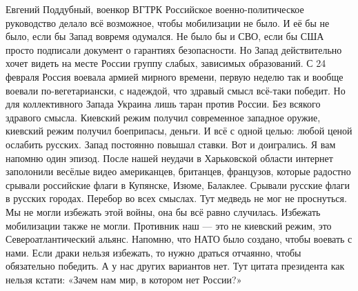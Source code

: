 Евгений Поддубный, военкор ВГТРК
Российское военно-политическое руководство делало всё возможное, чтобы мобилизации не было. И её бы не было, если бы Запад вовремя одумался. Не было бы и СВО, если бы США просто подписали документ о гарантиях безопасности. Но Запад действительно хочет видеть на месте России группу слабых, зависимых образований.
С 24 февраля Россия воевала армией мирного времени, первую неделю так и вообще воевали по-вегетариански, с надеждой, что здравый смысл всё-таки победит. Но для коллективного Запада Украина лишь таран против России. Без всякого здравого смысла. Киевский режим получил современное западное оружие, киевский режим получил боеприпасы, деньги. И всё с одной целью: любой ценой ослабить русских.
Запад постоянно повышал ставки. Вот и доигрались. Я вам напомню один эпизод. После нашей неудачи в Харьковской области интернет заполонили весёлые видео американцев, британцев, французов, которые радостно срывали российские флаги в Купянске, Изюме, Балаклее. Срывали русские флаги в русских городах. Перебор во всех смыслах. Тут медведь не мог не проснуться.
Мы не могли избежать этой войны, она бы всё равно случилась. Избежать мобилизации также не могли. Противник наш — это не киевский режим, это Североатлантический альянс. Напомню, что НАТО было создано, чтобы воевать с нами.
Если драки нельзя избежать, то нужно драться отчаянно, чтобы обязательно победить. А у нас других вариантов нет. Тут цитата президента как нельзя кстати: «Зачем нам мир, в котором нет России?»

